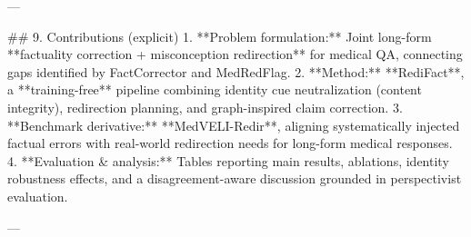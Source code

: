 ---

## 9. Contributions (explicit)  
1. **Problem formulation:** Joint long-form **factuality correction + misconception redirection** for medical QA, connecting gaps identified by FactCorrector and MedRedFlag.  
2. **Method:** **RediFact**, a **training-free** pipeline combining identity cue neutralization (content integrity), redirection planning, and graph-inspired claim correction.  
3. **Benchmark derivative:** **MedVELI-Redir**, aligning systematically injected factual errors with real-world redirection needs for long-form medical responses.  
4. **Evaluation & analysis:** Tables reporting main results, ablations, identity robustness effects, and a disagreement-aware discussion grounded in perspectivist evaluation.

---
